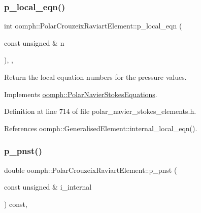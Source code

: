 \mbox{\label{classoomph_1_1PolarCrouzeixRaviartElement_a13dafb71fd6a720e02a6382b1a3274e7}} 
\subsubsection{\texorpdfstring{p\+\_\+local\+\_\+eqn()}{p\_local\_eqn()}}
{\footnotesize\ttfamily int oomph\+::\+Polar\+Crouzeix\+Raviart\+Element\+::p\+\_\+local\+\_\+eqn (\begin{DoxyParamCaption}\item[{const unsigned \&}]{n }\end{DoxyParamCaption})\hspace{0.3cm}{\ttfamily [inline]}, {\ttfamily [protected]}, {\ttfamily [virtual]}}



Return the local equation numbers for the pressure values. 



Implements \hyperlink{classoomph_1_1PolarNavierStokesEquations_a4738c2cb0df9ba80c581442ceade039e}{oomph\+::\+Polar\+Navier\+Stokes\+Equations}.



Definition at line 714 of file polar\+\_\+navier\+\_\+stokes\+\_\+elements.\+h.



References oomph\+::\+Generalised\+Element\+::internal\+\_\+local\+\_\+eqn().

\mbox{\label{classoomph_1_1PolarCrouzeixRaviartElement_ac11e6ee68acf235bb6d2b41a2bd77d89}} 
\subsubsection{\texorpdfstring{p\+\_\+pnst()}{p\_pnst()}}
{\footnotesize\ttfamily double oomph\+::\+Polar\+Crouzeix\+Raviart\+Element\+::p\+\_\+pnst (\begin{DoxyParamCaption}\item[{const unsigned \&}]{i\+\_\+internal }\end{DoxyParamCaption}) const\hspace{0.3cm}{\ttfamily [inline]}, {\ttfamily [virtual]}}



